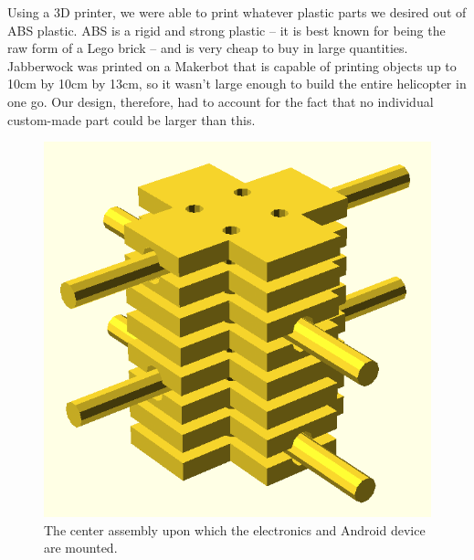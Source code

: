 Using a 3D printer, we were able to print whatever plastic parts we
desired out of ABS plastic. ABS is a rigid and strong plastic -- it is
best known for being the raw form of a Lego brick -- and is very cheap
to buy in large quantities. Jabberwock was printed on a Makerbot that
is capable of printing objects up to 10cm by 10cm by 13cm, so it
wasn't large enough to build the entire helicopter in one go. Our
design, therefore, had to account for the fact that no individual
custom-made part could be larger than this.

\begin{figure}[htb]
  \centering
  \includegraphics[scale=0.4]{figures/brock_assembly}
  \caption{The center assembly upon which the electronics and Android
    device are mounted.}
  \label{fig:brock}
\end{figure}

